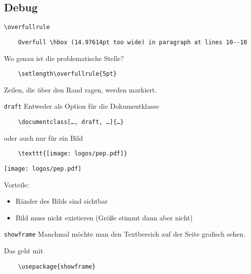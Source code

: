 \subsection{Debug}

\begin{frame}[fragile]{\texttt{\textbackslash overfullrule}}

  \vspace{\baselineskip}
  \begin{lstlisting}
    Overfull \hbox (14.97614pt too wide) in paragraph at lines 10--10
  \end{lstlisting}
  Wo genau ist die problematische Stelle?

  \vspace{\baselineskip}
  \begin{lstlisting}
    \setlength\overfullrule{5pt}
  \end{lstlisting}

  \setlength\overfullrule{5pt}

  \vspace{\baselineskip}
  Zeilen, die über den Rand ragen, werden markiert.
\end{frame}

\begin{frame}[fragile]{\texttt{draft}}
  Entweder als Option für die Dokumentklasse
  \begin{lstlisting}
    \documentclass[…, draft, …]{…}
  \end{lstlisting}
  oder auch nur für ein Bild
  \begin{lstlisting}
    \texttt{[image: logos/pep.pdf]}
  \end{lstlisting}
  \texttt{[image: logos/pep.pdf]}

  Vorteile:
  \begin{itemize}
    \item Ränder des Bilds sind sichtbar
    \item Bild muss nicht existieren (Größe stimmt dann aber nicht)
  \end{itemize}
\end{frame}

\AddToShipoutPictureFG*{\ShowFramePicture}
\begin{frame}[fragile]{\texttt{showframe}}
  Manchmal möchte man den Textbereich auf der Seite grafisch sehen.

  Das geht mit
  \begin{lstlisting}
    \usepackage{showframe}
  \end{lstlisting}
\end{frame}

